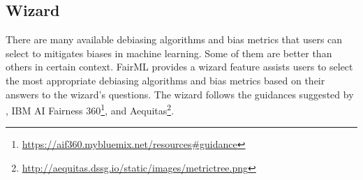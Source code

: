 \documentclass[sigconf,review]{acmart}
\begin{document}
\subsection{Wizard}
\label{sec:wizard}
There are many available debiasing algorithms and bias metrics that users can select to mitigates biases in machine learning. Some of them are better than others in certain context. FairML provides a wizard feature assists users to select the most appropriate debiasing algorithms and bias metrics based on their answers to the wizard's questions. The wizard follows the guidances suggested by \cite{mahoney2020ai}, IBM AI Fairness 360\footnote{\url{https://aif360.mybluemix.net/resources\#guidance}}, and Aequitas\footnote{\url{http://aequitas.dssg.io/static/images/metrictree.png}}.
\end{document}
